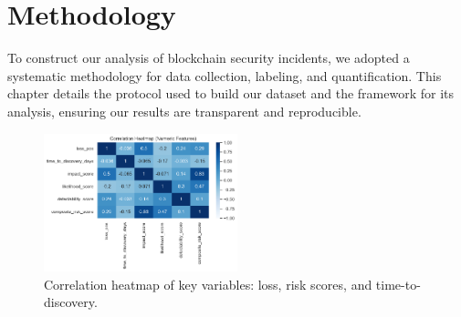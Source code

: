 \section{Methodology}
\label{sec:methodology}

To construct our analysis of blockchain security incidents, we adopted a systematic methodology for data collection, labeling, and quantification. This chapter details the protocol used to build our dataset and the framework for its analysis, ensuring our results are transparent and reproducible.

\begin{figure}[H]
\centering
\includegraphics[width=0.5\textwidth]{../figure/Figure/figures_2/G1_correlation_heatmap.png}
\caption{Correlation heatmap of key variables: loss, risk scores, and time-to-discovery.}
\label{fig:correlation_heatmap}
\end{figure}






